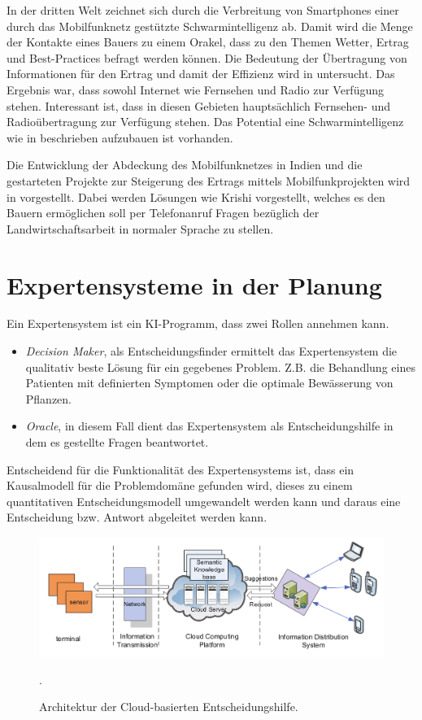 In der dritten Welt zeichnet sich durch die Verbreitung von Smartphones einer durch das Mobilfunknetz gestützte Schwarmintelligenz ab. Damit wird die Menge der Kontakte eines Bauers zu einem Orakel, dass zu den Themen Wetter, Ertrag und Best-Practices befragt werden können.\cite{jour:Razaque2013} Die Bedeutung der Übertragung von Informationen für den Ertrag und damit der Effizienz wird in \cite{jour:State2013} untersucht. Das Ergebnis war, dass sowohl Internet wie Fernsehen und Radio zur Verfügung stehen. Interessant ist, dass in diesen Gebieten hauptsächlich Fernsehen- und Radioübertragung zur Verfügung stehen. Das Potential eine Schwarmintelligenz wie in \cite{jour:razaque2013} beschrieben aufzubauen ist vorhanden.

Die Entwicklung der Abdeckung des Mobilfunknetzes in Indien und die gestarteten Projekte zur Steigerung des Ertrags mittels Mobilfunkprojekten wird in \cite{article:Kokate2013} vorgestellt. Dabei werden Lösungen wie Krishi vorgestellt, welches es den Bauern ermöglichen soll per Telefonanruf Fragen bezüglich der Landwirtschaftsarbeit in normaler Sprache zu stellen. 

\section{Expertensysteme in der Planung}
Ein Expertensystem ist ein KI-Programm, dass zwei Rollen annehmen kann.
\begin{itemize}
	\item \textit{Decision Maker}, als Entscheidungsfinder ermittelt das Expertensystem die qualitativ beste Lösung für ein gegebenes Problem. Z.B. die Behandlung eines Patienten mit definierten Symptomen oder die optimale Bewässerung von Pflanzen.
	\item \textit{Oracle}, in diesem Fall dient das Expertensystem als Entscheidungshilfe in dem es gestellte Fragen beantwortet. 
\end{itemize}
Entscheidend für die Funktionalität des Expertensystems ist, dass ein Kausalmodell für die Problemdomäne gefunden wird, dieses zu einem quantitativen Entscheidungsmodell umgewandelt werden kann und daraus eine Entscheidung bzw. Antwort abgeleitet werden kann.\cite{book:Russell1995}

\begin{figure}[h]
 \includegraphics[scale=0.35,natwidth=\textwidth]{figures/designtools/cloud_iot_decisionmaker.png}
 \centering
 \label{fig:fmishierarchy}
 \caption{Architektur der Cloud-basierten Entscheidungshilfe.\cite{jour:Yuan2013}}.
\end{figure}

